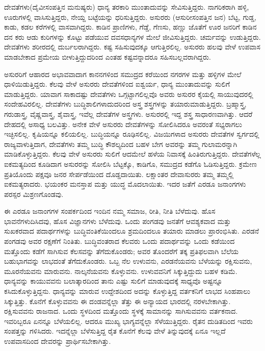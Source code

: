 \vskip 3pt

ದೇವತೆಗಳು(ದೈವೀಸಂಪತ್ತಿನ ಮನುಷ್ಯರು) ಧಾನ್ಯ ತರಕಾರಿ ಮುಂತಾದುವನ್ನು ಸೇವಿಸುತ್ತಿದ್ದರು. ನಾಗರಿಕರಾಗಿ ಹಳ್ಳಿ, ಊರುಗಳಲ್ಲಿ ವಾಸಿಸುತ್ತಿದ್ದರು, ನೇಯ್ದ ಬಟ್ಟೆಯನ್ನು ಧರಿಸುತ್ತಿದ್ದರು. ಅಸುರರು (ಆಸುರೀಸಂಪತ್ತಿನ ಜನ) ಬೆಟ್ಟ, ಗುಡ್ಡ, ಕಾಡು, ಕಡಲ ಕರೆಗಳಲ್ಲಿ ವಾಸವಾಗಿದ್ದರು. ಕಾಡಿನ ಪ್ರಾಣಿಗಳು, ಗೆಡ್ಡೆ, ಗೆಣಸು, ಹಣ್ಣು ಜೊತೆಗೆ ಊರ ಜನರಿಗೆ ಕಾಡಿನ ದನ ಕರು ಆಡು ಕುರಿಗಳನ್ನು ಕೊಟ್ಟು ಪಡೆಯುವ ದವಸಧಾನ್ಯಗಳ ಮೇಲೆ ಜೀವಿಸುತ್ತಿದ್ದರು. ಚರ್ಮವನ್ನು ಉಡುತ್ತಿದ್ದರು. ದೇವತೆಗಳು ಶರೀರದಲ್ಲಿ ದುರ್ಬಲರಾಗಿ\break ದ್ದರು. ಕಷ್ಟ ಸಹಿಸುವುದಕ್ಕೂ ಆಗುತ್ತಿರಲಿಲ್ಲ. ಅಸುರರು ಹಲವು ವೇಳೆ ಉಪವಾಸ ಮಾಡಬೇಕಾದ ಪ್ರಮೇಯ ಬೀಳುತ್ತಿದ್ದುದರಿಂದ ಎಂತಹ ಕಷ್ಟವನ್ನಾದರೂ ಸಹಿಸಬಲ್ಲವರಾಗಿದ್ದರು.

\vskip 3pt

ಅಸುರರಿಗೆ ಆಹಾರದ ಅಭಾವವಾದಾಗ ಕಾನನಗಳಿಂದ ಸಮುದ್ರದ ಕರೆಯಿಂದ ನಗರಗಳ ಮತ್ತು ಹಳ್ಳಿಗಳ ಮೇಲೆ ಧಾಳಿಯಿಡುತ್ತಿದ್ದರು. ಕೆಲವು ವೇಳೆ ಅಸುರರು ದೇವತೆ\break ಗಳಿಂದ ಐಶ್ವರ್ಯ, ಧಾನ್ಯ ಮುಂತಾದುವನ್ನು ಸುಲಿಗೆ ಮಾಡುತ್ತಿದ್ದರು. ಯಾವಾಗ ಸಾಕಾದಷ್ಟು ದೇವತೆಗಳು ಒಗ್ಗಟ್ಟಾಗಲಿಲ್ಲವೊ ಅವರು ಅಸುರರ ಕೈಯಲ್ಲಿ ಸಾಯುವುದರಲ್ಲಿ ಸಂದೇಹವಿರಲಿಲ್ಲ. ದೇವತೆಗಳು ಬುದ್ಧಿಶಾಲಿಗಳಾದುದರಿಂದ ಅಸ್ತ್ರ ಶಸ್ತ್ರಗಳನ್ನು ತಯಾರು\break ಮಾಡುತ್ತಿದ್ದರು. ಬ್ರಹ್ಮಾಸ್ತ್ರ, ಗರುಡಾಸ್ತ್ರ, ವೈಷ್ಣವಾಸ್ತ್ರ, ಶೈವಾಸ್ತ್ರ, ಇವೆಲ್ಲ ದೇವತೆಗಳ ಅಸ್ತ್ರಗಳು. ಅಸುರರಲ್ಲಿ ಇದ್ದ ಶಸ್ತ್ರ ಸಾಧಾರಣವಾಗಿತ್ತು. ಆದರೆ ದೇಹದಲ್ಲಿ ಅಸಾಧ್ಯ ಬಲವಿತ್ತು. ಅನೇಕ ವೇಳೆ ಅಸುರರು ದೇವತೆಗಳನ್ನು ಸೋಲಿಸಿದರೂ ಅವರಂತೆ ಸಭ್ಯರಾಗಲು ಇಚ್ಛಿಸಲಿಲ್ಲ. ಕೃಷಿಯನ್ನೂ ಕಲಿಯಲಿಲ್ಲ. ಬುದ್ಧಿಯನ್ನೂ ರೂಢಿಸಲಿಲ್ಲ. ವಿಜಯಿಗಳಾದ ಅಸುರರು ದೇವತೆಗಳ ಸ್ವರ್ಗದಲ್ಲಿ ರಾಜ್ಯವಾಳುತ್ತಿದಾಗ, ದೇವತೆಗಳು ತಮ್ಮ ಬುದ್ಧಿ ಕೌಶಲ್ಯದಿಂದ ಬಹಳ ಬೇಗ ಅವರನ್ನು ತಮ್ಮ ಗುಲಾಮರನ್ನಾಗಿ ಮಾಡಿಕೊಳ್ಳುತ್ತಿದ್ದರು. ಕೆಲವು ವೇಳೆ ಅಸುರರು ಸುಲಿಗೆ ಆದಮೇಲೆ ಹಳೆಯ ನಿವಾಸಕ್ಕೆ ಹಿಂತಿರುಗುತ್ತಿದ್ದರು. ದೇವತೆಗಳೆಲ್ಲ ಐಕಮತ್ಯದಿಂದ ಕೂಡಿದಾಗ ಅಸುರರನ್ನು ಸೋಲಿಸಿ ಬೆಟ್ಟಕ್ಕೊ, ಕಾಡಿಗೊ, ಸಮುದ್ರದ ಕಡೆಗೊ ಓಡಿಸುತ್ತಿದ್ದರು. ಕ್ರಮೇಣ ಪ್ರತಿಯೊಂದು ಪಕ್ಷವೂ ಜನರ ಸೇರ್ಪಡೆಯಿಂದ ದೊಡ್ಡದಾಯಿತು. ಲಕ್ಷಾಂತರ ದೇವಾಸುರರು ತಮ್ಮ ತಮ್ಮಲ್ಲಿ ಐಕಮತ್ಯರಾದರು. ಭಯಂಕರ ಮನಸ್ತಾಪ ಮತ್ತು ಯುದ್ಧ ಮೊದಲಾಯಿತು. ಇದರ ಜತೆಗೆ ಎರಡೂ ಜನಾಂಗಗಳು ಪರಸ್ಪರ ಮಿಶ್ರಣಗೊಂಡವು.

\vskip 3pt

ಈ ಎರಡೂ ಜನಾಂಗಗಳ ಸಂಪರ್ಕದಿಂದ ಇಂದಿನ ನಮ್ಮ ಸಮಾಜ, ರೀತಿ, ನೀತಿ ಬೆಳೆದುವು. ಹೊಸ ಭಾವನೆಗಳುದಿಸಿದವು, ಹೊಸ ವಿಜ್ಞಾನಗಳು ಬೆಳೆದುವು. ಒಂದು ಪಂಗಡವು ಜನತೆಗೆ ಆವಶ್ಯಕವಾದ ಮತ್ತು ಸುಖಕರವಾದ ಪದಾರ್ಥಗಳನ್ನು ಬುದ್ಧಿವಂತಿಕೆ\break ಯಿಂದಲೂ ಶ್ರಮದಿಂದಲೂ ತಯಾರು ಮಾಡಲು ಪ್ರಾರಂಭಿಸಿತು. ಎರಡನೆ ಪಂಗಡವು ಅವರ ರಕ್ಷಣೆಗೆ ನಿಂತಿತು. ಬುದ್ಧಿವಂತರಾದ ಕೆಲವರು ಒಂದು ಪದಾರ್ಥವನ್ನು ಒಂದು ಕಡೆಯಿಂದ ಮತ್ತೊಂದು ಕಡೆಗೆ ಸಾಗಿಸುವ ಕೆಲಸವನ್ನು ತೆಗೆದುಕೊಂಡರು; ಅವರ ತೊಂದರೆಗೆ ತಕ್ಕ ಪ್ರತಿಫಲವಾಗಿ ಬೆಲೆಯ ಬಹುಭಾಗವನ್ನು ಲಾಭದಂತೆ ತೆಗೆದುಕೊಂಡರು. ಒಬ್ಬ ನೆಲ ಉಳುವನು, ಎರಡನೆಯವನು ಬೆಳೆಯನ್ನು ರಕ್ಷಿಸುವನು, ಮೂರನೆಯವನು ಮಾರುವನು. ನಾಲ್ಕನೆಯವನು ಕೊಳ್ಳುವನು. ಉಳುವವನಿಗೆ ಸಿಕ್ಕುತ್ತಿದ್ದುದು ಬಹಳ ಕಡಿಮೆ. ಧಾನ್ಯವನ್ನು ಕಾಯುವವನು ಬಲಾತ್ಕಾರದಿಂದ ತಾನು ಎಷ್ಟು ಸುಲಿಗೆ ಮಾಡುವುದಕ್ಕೆ ಸಾಧ್ಯವೊ ಅಷ್ಟನ್ನೂ ಕಸಿದುಕೊಳ್ಳುತ್ತಿದ್ದನು. ಧಾನ್ಯವನ್ನು ಮಾರುವ ಉದ್ದೇಶದಿಂದ ಅದನ್ನು ಕೊಳ್ಳುತ್ತಿದ್ದ ವರ್ತಕ\break ನಿಗೆ ಲಾಭದ ಸಿಂಹಪಾಲು ಸಿಕ್ಕುತ್ತಿತ್ತು. ಕೊನೆಗೆ ಕೊಳ್ಳುವವನು ಈ ದಂಡವನ್ನೆಲ್ಲಾ ತೆತ್ತು ಈ ಅನ್ಯಾಯದ ಭಾರದಲ್ಲಿ ನರಳಬೇಕಾಗಿತ್ತು. ರಕ್ಷಿಸುವವನು ರಾಜನಾದ. ಒಂದು ಸ್ಥಳದಿಂದ ಮತ್ತೊಂದು ಸ್ಥಳಕ್ಕೆ ಸಾಮಾನನ್ನು ಸಾಗಿಸುವವನು ವರ್ತಕನಾದ. ಇವರಿಬ್ಬರೂ ಏನನ್ನೂ ಬೆಳೆಯಲಿಲ್ಲ. ಆದರೂ ಮುಖ್ಯ ಭಾಗ್ಯವನ್ನೆಲ್ಲಾ ಸೆಳೆಯುತ್ತಿದ್ದರು. ರೈತನ ದುಡಿತದಿಂದ ಇವರು ಸಂಪತ್ತನ್ನು ಗಳಿಸಿದರು. ಇದನ್ನೆಲ್ಲಾ ಬೆಳೆಸುತ್ತಿದ್ದ ರೈತ ಕೊನೆಗೆ ಕೆಲವು ವೇಳೆ ತಿನ್ನುವುದಕ್ಕೆ ಏನೂ ಇಲ್ಲದೆ ಉಪವಾಸದಿಂದ ದೇವರನ್ನು ಪ್ರಾರ್ಥಿಸಬೇಕಾಗಿತ್ತು.

